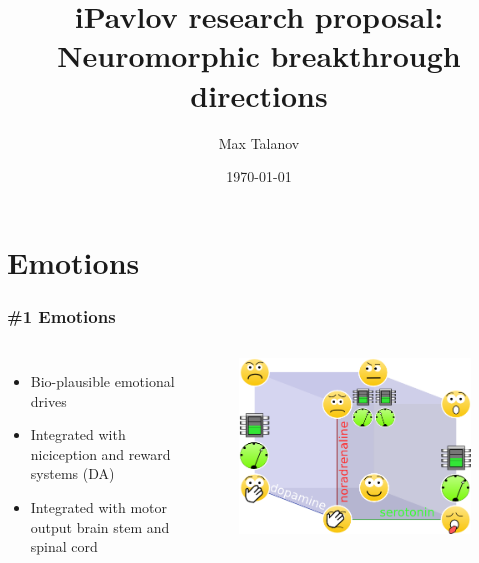 \documentclass[12pt, aspectratio=169]{beamer}
\title[HSE research proposal]{iPavlov research proposal: \\Neuromorphic breakthrough directions} %
\author[Max Talanov]{
  Max Talanov
}
\institute[for: HSE] %
{
for HSE \\ %
\medskip
\textit{max.talanov@gmail.com} %
}
\date{\today} %
\begin{document}
\begin{frame}
\titlepage %
\end{frame}



\section{Emotions}

\begin{frame}
\frametitle{\#1 Emotions}
\begin{columns}[c] %


\begin{itemize}
\item Bio-plausible emotional drives
\item Integrated with niciception and reward systems (DA)
\item Integrated with motor output brain stem and spinal cord
\end{itemize}

\begin{figure}
\includegraphics[width=0.8\linewidth]{cube_of_emotional_parameters_machine}
\end{figure}
\end{columns}
\end{frame}
\end{document}
